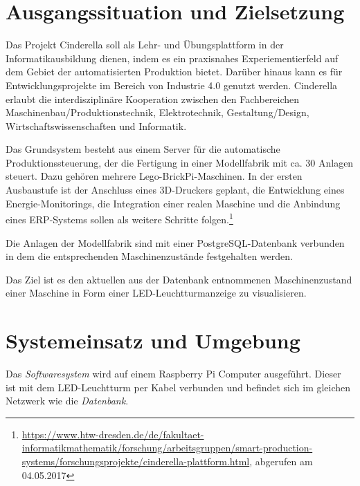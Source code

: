 \documentclass{scrartcl}
\date{04.05.2017}
\begin{document}
\maketitle
\tableofcontents 
\section{Ausgangssituation und Zielsetzung}
Das Projekt Cinderella soll als Lehr- und Übungsplattform in der Informatikausbildung dienen, indem es ein praxisnahes Experiementierfeld auf dem Gebiet der automatisierten Produktion bietet. Darüber hinaus kann es für Entwicklungsprojekte im Bereich von Industrie 4.0 genutzt werden. Cinderella erlaubt die interdisziplinäre Kooperation zwischen den Fachbereichen Maschinenbau/Produktionstechnik, Elektrotechnik, Gestaltung/Design, Wirtschaftswissenschaften und Informatik.

Das Grundsystem besteht aus einem Server für die automatische Produktionssteuerung, der die Fertigung in einer Modellfabrik mit ca. 30 Anlagen steuert. Dazu gehören mehrere Lego-BrickPi-Maschinen. In der ersten Ausbaustufe ist der Anschluss eines 3D-Druckers geplant, die Entwicklung eines Energie-Monitorings, die Integration einer realen Maschine und die Anbindung eines ERP-Systems sollen als weitere Schritte folgen.\footnote{\href{https://www.htw-dresden.de/de/fakultaet-informatikmathematik/forschung/arbeitsgruppen/smart-production-systems/forschungsprojekte/cinderella-plattform.html}{https://www.htw-dresden.de/de/fakultaet-informatikmathematik/forschung/arbeitsgruppen/smart-production-systems/forschungsprojekte/cinderella-plattform.html}, abgerufen am 04.05.2017} \bigskip

Die Anlagen der Modellfabrik sind mit einer PostgreSQL-Datenbank verbunden in dem die entsprechenden Maschinenzustände festgehalten werden.

Das Ziel ist es den aktuellen aus der Datenbank entnommenen Maschinenzustand einer Maschine in Form einer LED-Leuchtturmanzeige zu visualisieren. 

\section{Systemeinsatz und Umgebung}
Das \emph{Softwaresystem} wird auf einem Raspberry Pi Computer ausgeführt. Dieser ist mit dem LED-Leuchtturm per Kabel verbunden und befindet sich im gleichen Netzwerk wie die \emph{Datenbank}.
\end{document}
